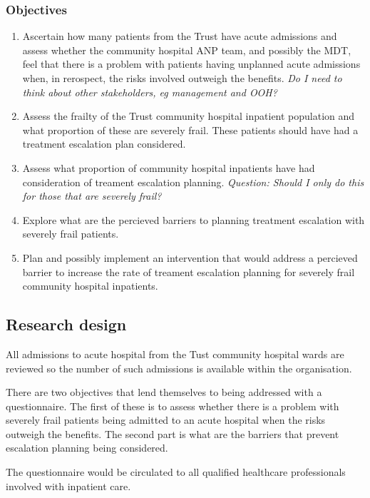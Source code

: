 \documentclass[12pt,a4paper,oneside,titlepage]{article}
\begin{document}
\subsubsection*{Objectives}
\begin{enumerate}
\item Ascertain how many patients from the Trust have acute admissions and assess 
	whether the community hospital ANP team, and possibly the MDT, 
	feel that there is a  problem with patients 
	having unplanned acute admissions when, in rerospect, the risks involved
	outweigh the benefits. \emph{Do I need to think about other stakeholders, eg management
		and OOH?}
\item Assess the frailty of the Trust community hospital inpatient population
	and what proportion of these are severely frail.
	These patients should have had a treatment escalation plan considered.
\item Assess what proportion of community hospital inpatients have had consideration
	of treament escalation planning. 
	\emph{Question: Should I only do this for those that are severely frail?}
\item Explore what are the percieved barriers to planning treatment escalation
	with severely frail patients.
\item Plan and possibly implement an intervention that would address a percieved
	barrier to increase the rate of treament escalation planning for severely frail
	community hospital inpatients.


\end{enumerate}

\subsection*{Research design}

All admissions to acute hospital from the Tust community hospital wards are reviewed
so the number of such admissions is available within the organisation.

There are two objectives that lend themselves to being addressed with a questionnaire.
The first of these is to assess whether there is a problem with severely frail 
patients being admitted to an acute hospital when the risks outweigh the benefits.
The second part is what are the barriers that prevent escalation planning 
being considered.

The questionnaire would be circulated to all qualified healthcare
professionals involved with inpatient care. 
\end{document}
